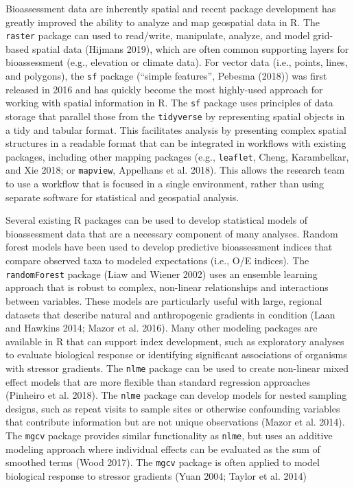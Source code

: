 \documentclass[fleqn,10pt,lineno]{wlpeerj} %
\begin{document}
Bioassessment data are inherently spatial and recent package development has greatly improved the ability to analyze and map geospatial data in R. The \texttt{raster} package can used to read/write, manipulate, analyze, and model grid-based spatial data (Hijmans 2019), which are often common supporting layers for bioassessment (e.g., elevation or climate data). For vector data (i.e., points, lines, and polygons), the \texttt{sf} package (``simple features'', Pebesma (2018)) was first released in 2016 and has quickly become the most highly-used approach for working with spatial information in R. The \texttt{sf} package uses principles of data storage that parallel those from the \texttt{tidyverse} by representing spatial objects in a tidy and tabular format. This facilitates analysis by presenting complex spatial structures in a readable format that can be integrated in workflows with existing packages, including other mapping packages (e.g., \texttt{leaflet}, Cheng, Karambelkar, and Xie 2018; or \texttt{mapview}, Appelhans et al. 2018). This allows the research team to use a workflow that is focused in a single environment, rather than using separate software for statistical and geospatial analysis.

Several existing R packages can be used to develop statistical models of bioassessment data that are a necessary component of many analyses. Random forest models have been used to develop predictive bioassessment indices that compare observed taxa to modeled expectations (i.e., O/E indices). The \texttt{randomForest} package (Liaw and Wiener 2002) uses an ensemble learning approach that is robust to complex, non-linear relationships and interactions between variables. These models are particularly useful with large, regional datasets that describe natural and anthropogenic gradients in condition (Laan and Hawkins 2014; Mazor et al. 2016). Many other modeling packages are available in R that can support index development, such as exploratory analyses to evaluate biological response or identifying significant associations of organisms with stressor gradients. The \texttt{nlme} package can be used to create non-linear mixed effect models that are more flexible than standard regression approaches (Pinheiro et al. 2018). The \texttt{nlme} package can develop models for nested sampling designs, such as repeat visits to sample sites or otherwise confounding variables that contribute information but are not unique observations (Mazor et al. 2014). The \texttt{mgcv} package provides similar functionality as \texttt{nlme}, but uses an additive modeling approach where individual effects can be evaluated as the sum of smoothed terms (Wood 2017). The \texttt{mgcv} package is often applied to model biological response to stressor gradients (Yuan 2004; Taylor et al. 2014)
\end{document}
